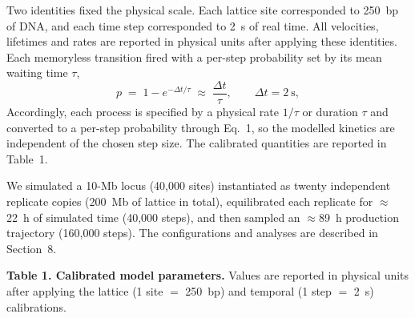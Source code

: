 \documentclass[11pt]{article}
\begin{document}
Two identities fixed the physical scale. Each lattice site corresponded to 250~bp of
DNA, and each time step corresponded to 2~s of real time. All velocities,
lifetimes and rates are reported in physical units after applying these
identities. Each memoryless transition fired with a per-step probability set by its
mean waiting time $\tau$,
%
\begin{equation}
p \;=\; 1 - e^{-\Delta t/\tau} \;\approx\; \frac{\Delta t}{\tau},
\qquad \Delta t = 2\ \mathrm{s},
\end{equation}
%
Accordingly, each process is specified by a physical rate $1/\tau$ or duration $\tau$ and
converted to a per-step probability through Eq.~1, so the modelled kinetics are
independent of the chosen step size. The
calibrated quantities are reported in Table~1.

We simulated a 10-Mb locus (40{,}000 sites) instantiated as twenty independent
replicate copies (200~Mb of lattice in total), equilibrated each replicate for
$\approx$22~h of simulated time (40{,}000 steps), and then sampled an
$\approx$89~h production trajectory (160{,}000 steps). The configurations and
analyses are described in Section~8.

\medskip
\noindent\textbf{Table 1. Calibrated model parameters.} Values are reported in
physical units after applying the lattice (1 site $=$ 250~bp) and temporal
(1 step $=$ 2~s) calibrations.
\end{document}
